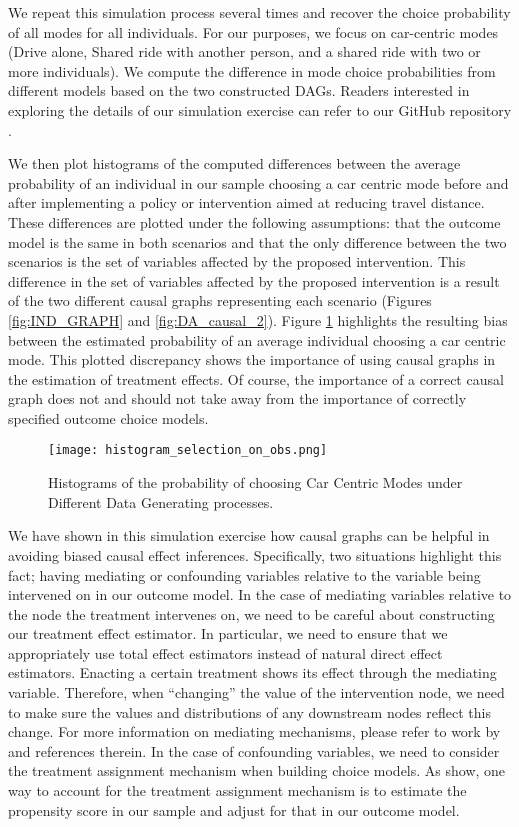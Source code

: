 We repeat this simulation process several times and recover the choice probability of all modes for all individuals.
For our purposes, we focus on car-centric modes (Drive alone, Shared ride with another person,
and a shared ride with two or more individuals).
We compute the difference in mode choice probabilities from different models based on the two constructed DAGs.
Readers interested in exploring the details of our simulation exercise can refer to our GitHub repository \citep{brathwaite_etal_2020}.



We then plot histograms of the computed differences between the average probability of an individual
in our sample choosing a car centric mode before and after implementing a policy or intervention
aimed at reducing travel distance.
These differences are plotted under the following assumptions: that the outcome model is the same in both scenarios and that the only difference between the two scenarios is the set of variables affected by the proposed intervention.
This difference in the set of variables affected by the proposed intervention is a result of the two different causal graphs representing each scenario (Figures \ref{fig:IND_GRAPH} and \ref{fig:DA_causal_2}).
Figure \ref{fig:histogram_probability} highlights the resulting bias between the estimated probability of an average individual choosing a car centric mode.
This plotted discrepancy shows the importance of using causal graphs in the estimation of treatment effects.
Of course, the importance of a correct causal graph does not and should not take away from the importance of correctly specified outcome choice models.

\begin{figure}[h!]
   \centering
   \texttt{[image: histogram\_selection\_on\_obs.png]}
   \caption{Histograms of the probability of choosing Car Centric Modes under Different Data Generating processes.}
   \label{fig:histogram_probability}
\end{figure}

We have shown in this simulation exercise how causal graphs can be helpful in avoiding biased causal effect inferences.
Specifically, two situations highlight this fact; having mediating or confounding variables relative to the variable being intervened on in our outcome model.
In the case of mediating variables relative to the node the treatment intervenes on, we need to be careful about constructing our treatment effect estimator.
In particular, we need to ensure that we appropriately use total effect estimators instead of natural direct effect estimators.
Enacting a certain treatment shows its effect through the mediating variable.
Therefore, when ``changing'' the value of the intervention node, we need to make sure the values and distributions of any downstream nodes reflect this change.
For more information on mediating mechanisms, please refer to work by \citet{pearl_2012_mediation} and references therein.
In the case of confounding variables, we need to consider the treatment assignment mechanism when building choice models.
As \citep{hahn_2020_bayesian} show, one way to account for the treatment assignment mechanism is to estimate the propensity score in our sample and adjust for that in our outcome model.


